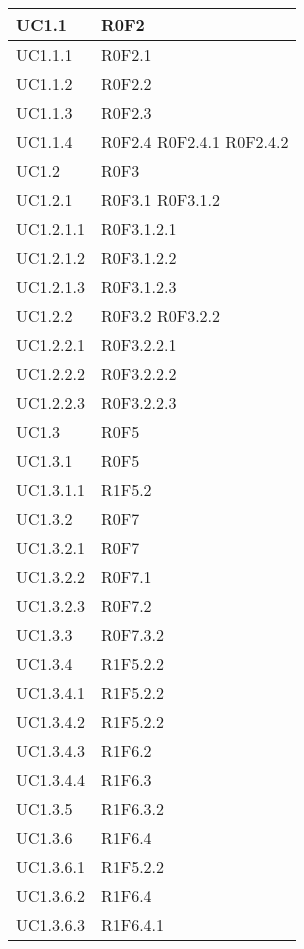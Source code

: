 \begin{center}
\begin{longtable}{| p{4cm} | p{4cm} |}
		UC1.1  &  R0F2 \\
		\hline
		UC1.1.1  &  R0F2.1 \\
		\hline
		UC1.1.2  &  R0F2.2 \\
		\hline
		UC1.1.3  &  R0F2.3 \\
		\hline
		UC1.1.4  &  R0F2.4 \newline R0F2.4.1 \newline R0F2.4.2\\
		\hline
		UC1.2  &  R0F3 \\
		\hline
		UC1.2.1  &  R0F3.1 \newline R0F3.1.2 \\
		\hline
		UC1.2.1.1  &  R0F3.1.2.1  \\
		\hline
		UC1.2.1.2  &  R0F3.1.2.2  \\
		\hline
		UC1.2.1.3  &  R0F3.1.2.3  \\
		\hline
		UC1.2.2  &  R0F3.2 \newline R0F3.2.2 \\
		\hline
		UC1.2.2.1  &  R0F3.2.2.1 \\
		\hline
		UC1.2.2.2  &  R0F3.2.2.2 \\
		\hline
		UC1.2.2.3  &  R0F3.2.2.3 \\
		\hline	
		UC1.3  &  R0F5 \\
		\hline
		UC1.3.1  &  R0F5 \\
		\hline
		UC1.3.1.1  &  R1F5.2 \\
		\hline
		UC1.3.2  &  R0F7 \\
		\hline
		UC1.3.2.1  &  R0F7 \\
		\hline
		UC1.3.2.2  &  R0F7.1 \\
		\hline
		UC1.3.2.3  &  R0F7.2 \\
		\hline
		UC1.3.3  &  R0F7.3.2 \\
		\hline
		UC1.3.4  &  R1F5.2.2 \\
		\hline
		UC1.3.4.1  &  R1F5.2.2 \\
		\hline
		UC1.3.4.2  &  R1F5.2.2 \\
		\hline
		UC1.3.4.3  &  R1F6.2 \\
		\hline
		UC1.3.4.4  &  R1F6.3 \\
		\hline
		UC1.3.5  &  R1F6.3.2 \\
		\hline
		UC1.3.6  &  R1F6.4 \\
		\hline
		UC1.3.6.1  &  R1F5.2.2 \\
		\hline
		UC1.3.6.2  &  R1F6.4 \\
		\hline
		UC1.3.6.3  &  R1F6.4.1 \\

\end{longtable}
\end{center}
